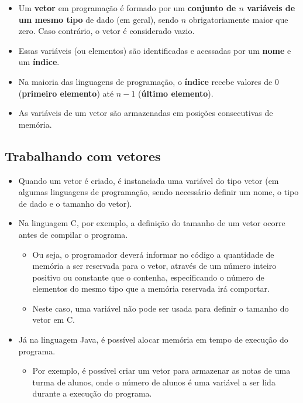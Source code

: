 \documentclass[12pt,a4paper]{article}
\providecommand{\tightlist}{%
      \setlength{\itemsep}{0pt}\setlength{\parskip}{0pt}}
\begin{document}
    \begin{itemize}
\tightlist
\item
  Um \textbf{vetor} em programação é formado por um \textbf{conjunto de
  \(n\) variáveis de um mesmo tipo} de dado (em geral), sendo \(n\)
  obrigatoriamente maior que zero. Caso contrário, o vetor é considerado
  vazio.
\item
  Essas variáveis (ou elementos) são identificadas e acessadas por um
  \textbf{nome} e um \textbf{índice}.
\item
  Na maioria das linguagens de programação, o \textbf{índice} recebe
  valores de \(0\) (\textbf{primeiro elemento}) até \(n-1\)
  (\textbf{último elemento}).
\item
  As variáveis de um vetor são armazenadas em posições consecutivas de
  memória.
\end{itemize}

    \hypertarget{trabalhando-com-vetores}{%
\subsection{Trabalhando com vetores}\label{trabalhando-com-vetores}}

    \begin{itemize}
\tightlist
\item
  Quando um vetor é criado, é instanciada uma variável do tipo vetor (em
  algumas linguagens de programação, sendo necessário definir um nome, o
  tipo de dado e o tamanho do vetor).
\item
  Na linguagem C, por exemplo, a definição do tamanho de um vetor ocorre
  antes de compilar o programa.

  \begin{itemize}
  \tightlist
  \item
    Ou seja, o programador deverá informar no código a quantidade de
    memória a ser reservada para o vetor, através de um número inteiro
    positivo ou constante que o contenha, especificando o número de
    elementos do mesmo tipo que a memória reservada irá comportar.
  \item
    Neste caso, uma variável não pode ser usada para definir o tamanho
    do vetor em C.
  \end{itemize}
\item
  Já na linguagem Java, é possível alocar memória em tempo de execução
  do programa.

  \begin{itemize}
  \tightlist
  \item
    Por exemplo, é possível criar um vetor para armazenar as notas de
    uma turma de alunos, onde o número de alunos é uma variável a ser
    lida durante a execução do programa.
  \end{itemize}
\end{itemize}
\end{document}
